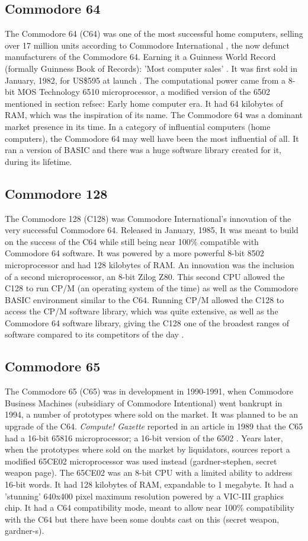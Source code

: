 \subsection{Commodore 64}
The Commodore 64 (C64) was one of the most successful home computers, selling over 17 million units according to Commodore International 
\cite{pagetable}, the now defunct manufacturers of the Commodore 64. Earning it a Guinness World Record (formally Guinness Book of Records): 'Most computer sales'
\cite{guinness}.
It was first sold in January, 1982, for US\$595 at launch 
\cite{infoworld82}. The computational power came from a 8-bit MOS Technology 6510 microprocessor, a modified version of the 6502 mentioned in section ref{sec: Early home computer era}. It had 64 kilobytes of RAM, which was the inspiration of its name. The Commodore 64 was a dominant market presence in its time. In a category of influential computers (home computers), the Commodore 64 may well have been the most influential of all. It ran a version of BASIC and there was a huge software library created for it, during its lifetime.

\subsection{Commodore 128}
The Commodore 128 (C128) was Commodore International's innovation of the very successful Commodore 64. Released in January, 1985, It was meant to build on the success of the C64 while still being near 100\% compatible with Commodore 64 software. It was powered by a more powerful 8-bit 8502 microprocessor and had 128 kilobytes of RAM. An innovation was the inclusion of a second microprocessor, an 8-bit Zilog Z80. This second CPU allowed the C128 to run CP/M (an operating system of the time) as well as the Commodore BASIC environment similar to the C64. Running CP/M allowed the C128 to access the CP/M software library, which was quite extensive, as well as the Commodore 64 software library, giving the C128 one of the broadest ranges of software compared to its competitors of the day
\cite{runmag}.

\subsection{Commodore 65}
The Commodore 65 (C65) was in development in 1990-1991, when Commodore Business Machines (subsidiary of Commodore Intentional) went bankrupt in 1994, a number of prototypes where sold on the market. It was planned to be an upgrade of the C64. \textit{Compute! Gazette} reported in an article in 1989 that the C65 had a 16-bit 65816 microprocessor; a 16-bit version of the 6502 
\cite{gazette89}. Years later, when the prototypes where sold on the market by liquidators, sources report a modified 65CE02 microprocessor was used instead
\cite{secretweapon}  (gardner-stephen, secret weapon page). The 65CE02 was an 8-bit CPU with a limited ability to address 16-bit words. It had 128 kilobytes of RAM, expandable to 1 megabyte. It had a 'stunning' 640x400 pixel maximum resolution 
\cite{gazette89} powered by a VIC-III graphics chip. It had a C64 compatibility mode, meant to allow near 100\% compatibility with the C64 but there have been some doubts cast on this (secret weapon, gardner-s). 

